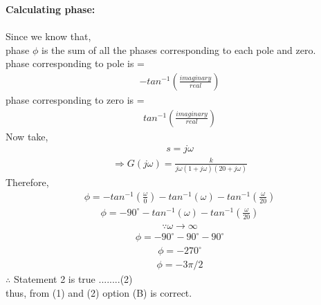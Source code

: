 \begin{enumerate}[label=\thesection.\arabic*.,ref=\thesection.\theenumi]
\textbf{Calculating phase:}\\ \\
Since we know that,\\
phase $ \phi $ is the sum of all the phases corresponding to each pole and zero.\\
phase corresponding to pole is =  
\begin{align}
-tan^{-1}( \frac{imaginary}{real})
\end{align} 
phase corresponding to zero is =
\begin{align}
 tan^{-1}( \frac{imaginary}{real})
 \end{align} 
Now take,
\begin{align}
 s = j\omega
  \end{align} 
  \begin{align}
 \Rightarrow  G(j\omega) =  \frac{k}{j\omega(1+j\omega)(20+j\omega)}
 \end{align} 
Therefore, 
\begin{align}
 \phi =  -tan^{-1}( {\frac{\omega}{0}}) - tan^{-1}(\omega) - tan^{-1}( \frac{\omega}{20})
 \end{align} 
 \begin{align}
  \phi =  - 90^\circ - tan^{-1}(\omega) - tan^{-1}( \frac{\omega}{20})
  \end{align} 
  \begin{align}
  \because \omega \to \infty
 \end{align} 
 \begin{align}
   \phi =   - 90^\circ - 90^\circ - 90^\circ
   \end{align} 
   \begin{align}
 \phi = -270^\circ
 \end{align} 
 \begin{align}
 \phi = -3\pi/2 
 \end{align} 
 $\therefore$ Statement 2 is true ........(2)\\
 thus, from (1) and (2) option (B) is correct.
 \end{enumerate}